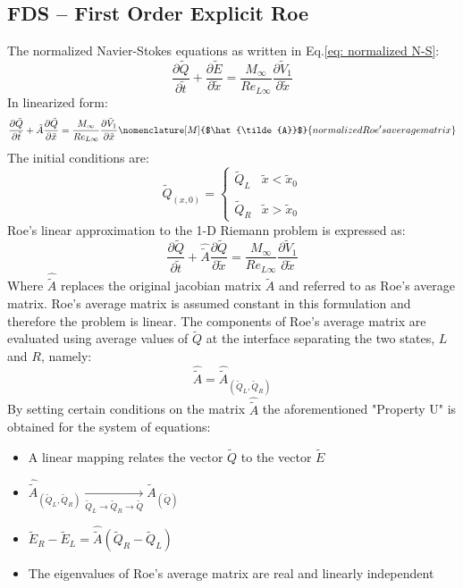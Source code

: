 \documentclass[11pt, a4paper]{article}
\newcommand{\parder}[2]{\frac{\partial {#1}}{\partial {#2}}}
\begin{document}
\subsection{FDS -- First Order Explicit Roe}
The normalized Navier-Stokes equations as written in Eq.\ref{eq: normalized N-S}:
\begin{equation}
    \parder{\tilde{Q}}{\tilde{t}}+\parder{\tilde{E}}{\tilde{x}}=\frac{M_\infty}{Re_{L\infty}}\parder{\tilde{V}_1}{\tilde{x}}
\end{equation}
In linearized form:
\begin{equation}
    \parder{\tilde{Q}}{\tilde{t}}+\tilde{A}\parder{\tilde{Q}}{\tilde{x}}=\frac{M_\infty}{Re_{L\infty}}\parder{\tilde{V}_1}{\tilde{x}}
    \nomenclature[M]{$\hat{\tilde{A}}$}{normalized Roe's average matrix}
\end{equation}
The initial conditions are:
\begin{equation*}
    \tilde{Q}_{\left(x,0\right)}=\left\{\begin{array}{lr}
        \tilde{Q}_L & \tilde{x}<\tilde{x}_0 \\\\
        \tilde{Q}_R & \tilde{x}>\tilde{x}_0
    \end{array}\right.
\end{equation*}
Roe's linear approximation to the 1-D Riemann problem is expressed as:
\begin{equation}
    \parder{\tilde{Q}}{\tilde{t}}+\hat{\tilde{A}}\parder{\tilde{Q}}{\tilde{x}}=\frac{M_\infty}{Re_{L\infty}}\parder{\tilde{V}_1}{\tilde{x}}
\end{equation}
Where $\hat{\tilde{A}}$ replaces the original jacobian matrix $\tilde{A}$ and referred to as Roe's average matrix. Roe's average matrix is assumed constant in this formulation and therefore the problem is linear. The components of Roe's average matrix are evaluated using average values of $\tilde{Q}$ at the interface separating the two states, $L$ and $R$, namely: $$\hat{\tilde{A}}=\hat{\tilde{A}}_{\left(\tilde{Q}_L,\tilde{Q}_R\right)}$$ By setting certain conditions on the matrix $\hat{\tilde{A}}$ the aforementioned "Property U" is obtained for the system of equations:
\begin{itemize}
    \item A linear mapping relates the vector $\tilde{Q}$ to the vector $\tilde{E}$
    \item $\hat{\tilde{A}}_{\left(\tilde{Q}_L,\tilde{Q}_R\right)}\xrightarrow[\tilde{Q}_L\rightarrow\tilde{Q}_R\rightarrow\tilde{Q}]{}\tilde{A}_{\left(\tilde{Q}\right)}$
    \item $\tilde{E}_R-\tilde{E}_L=\hat{\tilde{A}}\left(\tilde{Q}_R-\tilde{Q}_L\right)$
    \item The eigenvalues of Roe's average matrix are real and linearly independent
\end{itemize}
\end{document}
